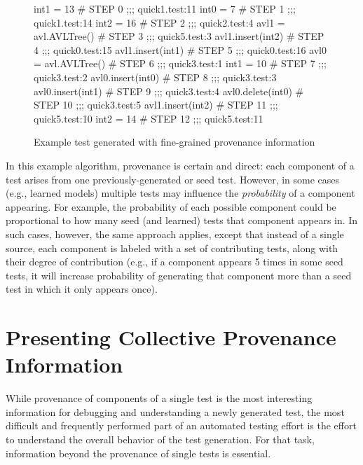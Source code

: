 \documentclass[final]{article}
\begin{document}
\begin{figure}
{\scriptsize
\begin{code}
int1 = 13                   \# STEP 0   ;;; quick1.test:11
int0 = 7                    \# STEP 1   ;;; quick1.test:14
int2 = 16                   \# STEP 2   ;;; quick2.test:4
avl1 = avl.AVLTree()        \# STEP 3   ;;; quick5.test:3
avl1.insert(int2)           \# STEP 4   ;;; quick0.test:15
avl1.insert(int1)           \# STEP 5   ;;; quick0.test:16
avl0 = avl.AVLTree()        \# STEP 6   ;;; quick3.test:1
int1 = 10                   \# STEP 7   ;;; quick3.test:2
avl0.insert(int0)           \# STEP 8   ;;; quick3.test:3
avl0.insert(int1)           \# STEP 9   ;;; quick3.test:4
avl0.delete(int0)           \# STEP 10  ;;; quick3.test:5
avl1.insert(int2)           \# STEP 11  ;;; quick5.test:10
int2 = 14                   \# STEP 12  ;;; quick5.test:11
\end{code}
}
\caption{Example test generated with fine-grained provenance information}
\label{fig:example}
\end{figure}

In this example algorithm, provenance is certain and direct:  each component of a
test arises from one previously-generated or seed test.  However, in
some cases (e.g., learned models) multiple tests may influence the
\emph{probability} of a component appearing.  For example, the
probability of each possible component could be proportional to how
many seed (and learned) tests that component appears in.  In such cases,
however, the same approach applies, except that instead of a single
source, each component is labeled with a set of contributing tests,
along with their degree of contribution (e.g., if a component appears
5 times in some seed tests, it will increase probability of generating
that component more than a seed test in which it only appears once).

\section{Presenting Collective Provenance Information}

While provenance of components of a single test is the most
interesting information for debugging and understanding a newly
generated test, the most difficult and frequently performed part of an
automated testing effort is the effort to understand the overall
behavior of the test generation.  For that task, information beyond
the provenance of single tests is essential.
\end{document}
